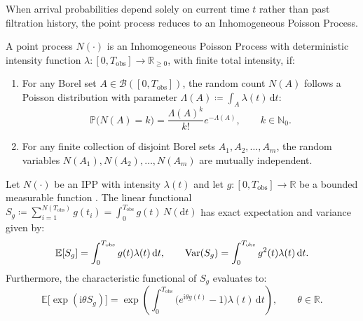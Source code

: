 When arrival probabilities depend solely on current time $t$ rather
than past filtration history, the point process reduces to an
Inhomogeneous Poisson Process.

\begin{definition}
  \label{def:ipp}
  A point process $N(\cdot)$ is an Inhomogeneous Poisson Process
  with deterministic intensity function $\lambda: [0,
  T_{\mathrm{obs}}] \to \mathbb{R}_{\ge0}$, with finite total intensity, if:
  \begin{enumerate}[label=(\roman*),noitemsep]
    \item For any Borel set $A \in \mathcal{B}([0,
      T_{\mathrm{obs}}])$, the random count $N(A)$ follows a Poisson
      distribution with parameter $\Lambda(A) \coloneqq \int_A
      \lambda(t) \, \mathrm{d}t$:
      \begin{equation}
        \mathbb{P}\bigl(N(A) = k\bigr) = \frac{\Lambda(A)^k}{k!}
        e^{-\Lambda(A)}, \qquad k \in \mathbb{N}_0.
        \label{eq:poisson_count_dist}
      \end{equation}
    \item For any finite collection of disjoint Borel sets $A_1,
      A_2, \dots, A_m$, the random variables $N(A_1), N(A_2), \dots,
      N(A_m)$ are mutually independent.
  \end{enumerate}
\end{definition}

\begin{theorem}
  \label{thm:campbell}
  Let $N(\cdot)$ be an \ac{IPP} with intensity $\lambda(t)$ and let
  $g: [0, T_{\mathrm{obs}}] \to \mathbb{R}$ be a bounded measurable
  function \parencite{kingman1993}. The linear functional $S_g \coloneqq
  \sum_{i=1}^{N(T_{\mathrm{obs}})} g(t_i) =
  \int_0^{T_{\mathrm{obs}}} g(t) \, N(\mathrm{d}t)$ has exact
  expectation and variance given by:
  \begin{equation}
    \mathbb{E}[S_g] = \int_0^{T_{\mathrm{obs}}} g(t) \lambda(t) \,
    \mathrm{d}t, \qquad
    \operatorname{Var}(S_g) = \int_0^{T_{\mathrm{obs}}} g^2(t) \lambda(t) \, \mathrm{d}t.
    \label{eq:campbell_mean_var}
  \end{equation}
  Furthermore, the characteristic functional of $S_g$ evaluates to:
  \begin{equation}
    \mathbb{E}\bigl[\exp(\mathrm{i}\theta S_g)\bigr] = \exp\left(
      \int_0^{T_{\mathrm{obs}}} \bigl(e^{\mathrm{i}\theta g(t)} -
    1\bigr)\lambda(t) \, \mathrm{d}t \right), \qquad \theta \in \mathbb{R}.
    \label{eq:campbell_char_fn}
  \end{equation}
\end{theorem}

